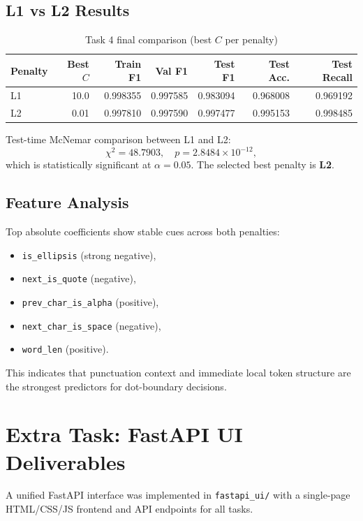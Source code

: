 \documentclass[10pt,a4paper]{article}
\begin{document}
\subsection{L1 vs L2 Results}
\begin{table}[H]
\centering
\caption{Task 4 final comparison (best $C$ per penalty)}
\label{tab:task4-compare}
\begin{tabular}{lrrrrrr}
\toprule
\textbf{Penalty} & \textbf{Best $C$} & \textbf{Train F1} & \textbf{Val F1} & \textbf{Test F1} & \textbf{Test Acc.} & \textbf{Test Recall} \\
\midrule
L1 & 10.0 & 0.998355 & 0.997585 & 0.983094 & 0.968008 & 0.969192 \\
L2 & 0.01 & 0.997810 & 0.997590 & 0.997477 & 0.995153 & 0.998485 \\
\bottomrule
\end{tabular}
\end{table}

Test-time McNemar comparison between L1 and L2:
\[
\chi^2 = 48.7903,\quad p = 2.8484 \times 10^{-12},
\]
which is statistically significant at $\alpha=0.05$. The selected best penalty is \textbf{L2}.

\subsection{Feature Analysis}
Top absolute coefficients show stable cues across both penalties:
\begin{itemize}
    \item \texttt{is\_ellipsis} (strong negative),
    \item \texttt{next\_is\_quote} (negative),
    \item \texttt{prev\_char\_is\_alpha} (positive),
    \item \texttt{next\_char\_is\_space} (negative),
    \item \texttt{word\_len} (positive).
\end{itemize}

This indicates that punctuation context and immediate local token structure are the strongest predictors for dot-boundary decisions.

\section{Extra Task: FastAPI UI Deliverables}

A unified FastAPI interface was implemented in \texttt{fastapi\_ui/} with a single-page HTML/CSS/JS frontend and API endpoints for all tasks.
\end{document}
